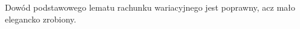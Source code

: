\documentclass[a4paper,11pt]{article}
\begin{document}














\newpage


\vspace{0em}


\vspace{0em}


 Dowód podstawowego lematu rachunku wariacyjnego jest
poprawny, acz mało elegancko zrobiony.







\vspace{\spaceTwo}



















{}






\end{document}
